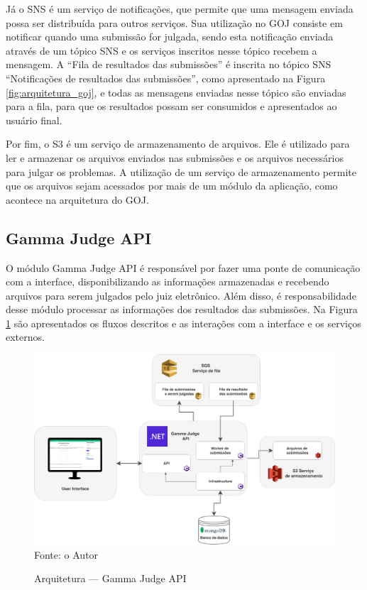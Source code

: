 Já o SNS é um serviço de notificações, que permite que uma mensagem enviada possa ser distribuída para outros serviços. Sua utilização no GOJ consiste em notificar quando uma submissão for julgada, sendo esta notificação enviada através de um tópico SNS e os serviços inscritos nesse tópico recebem a mensagem. A ``Fila de resultados das submissões'' é inscrita no tópico SNS ``Notificações de resultados das submissões'', como apresentado na Figura \ref{fig:arquitetura_goj}, e todas as mensagens enviadas nesse tópico são enviadas para a fila, para que os resultados possam ser consumidos e apresentados ao usuário final.

Por fim, o S3 é um serviço de armazenamento de arquivos. Ele é utilizado para ler e armazenar os arquivos enviados nas submissões e os arquivos necessários para julgar os problemas. A utilização de um serviço de armazenamento permite que os arquivos sejam acessados por mais de um módulo da aplicação, como acontece na arquitetura do GOJ.

\subsection{Gamma Judge API} 
\label{subsec:arquitetura_judge_api}

O módulo Gamma Judge API é responsável por fazer uma ponte de comunicação com a interface, disponibilizando as informações armazenadas e recebendo arquivos para serem julgados pelo juiz eletrônico. Além disso, é responsabilidade desse módulo processar as informações dos resultados das submissões. Na Figura \ref{fig:arquitetura_goj_api} são apresentados os fluxos descritos e as interações com a interface e os serviços externos.

\begin{figure}
    \centering
    \caption{Arquitetura — Gamma Judge API}
    \includegraphics[keepaspectratio=true,scale=0.35]{figuras/arquitetura_goj_api.eps}
    \label{fig:arquitetura_goj_api}
    \medskip
    Fonte: o Autor
    \medskip
\end{figure}

